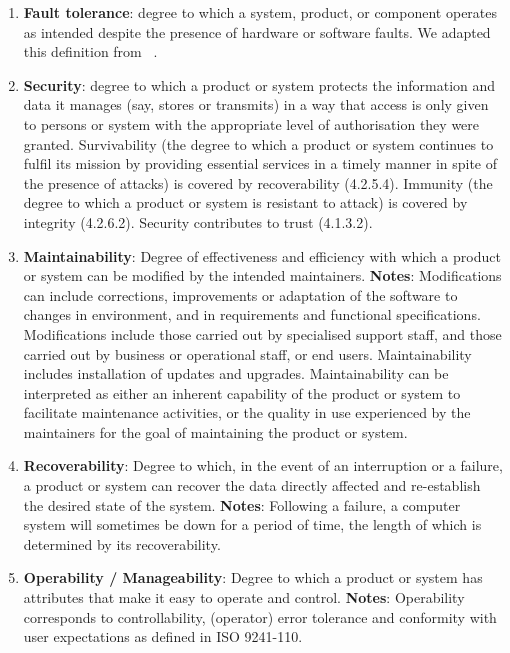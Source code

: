 \begin{enumerate}
    \item \textbf{Fault tolerance}: degree to which a system, product, or component operates as intended despite the presence of hardware or software faults. We adapted this definition from ~\cite{iso_central_secretary_isoiecieee_2010}.

    \item \textbf{Security}: degree to which a product or system protects the information and data it manages (say, stores or transmits) in a way that access is only given to persons or system with the appropriate level of authorisation they were granted.  Survivability (the degree to which a product or system continues to fulfil its mission by providing essential services in a timely manner in spite of the presence of attacks) is covered by recoverability (4.2.5.4). Immunity (the degree to which a product or system is resistant to attack) is covered by integrity (4.2.6.2). Security contributes to trust (4.1.3.2).

    \item \textbf{Maintainability}: Degree of effectiveness and efficiency with which a product or system can be modified by the intended maintainers. \textbf{Notes}: Modifications can include corrections, improvements or adaptation of the software to changes in environment, and in requirements and functional specifications. Modifications include those carried out by specialised support staff, and those carried out by business or operational staff, or end users. Maintainability includes installation of updates and upgrades. Maintainability can be interpreted as either an inherent capability of the product or system to facilitate maintenance activities, or the quality in use experienced by the maintainers for the goal of maintaining the product or system.

    \item \textbf{Recoverability}: Degree to which, in the event of an interruption or a failure, a product or system can recover the data directly affected and re-establish the desired state of the system. \textbf{Notes}: Following a failure, a computer system will sometimes be down for a period of time, the length of which is determined by its recoverability.

    \item \textbf{Operability / Manageability}: Degree to which a product or system has attributes that make it easy to operate and control. \textbf{Notes}: Operability corresponds to controllability, (operator) error tolerance and conformity with user expectations as defined in ISO 9241-110.


\end{enumerate}
